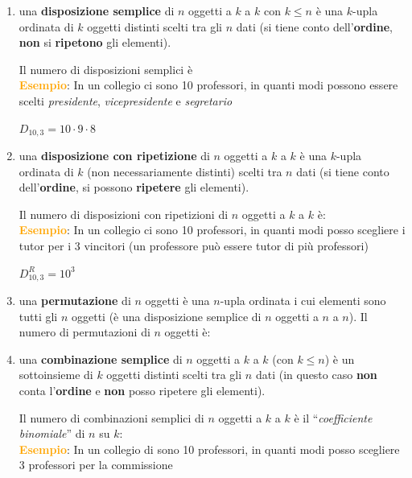 \begin{enumerate}[nosep]
    \item una \textbf{disposizione semplice} di $n$ oggetti a $k$ a $k$ con $k \leq n$ è una $k$-upla ordinata di $k$ oggetti distinti scelti tra gli $n$ dati (si tiene conto dell'\textbf{ordine}, \textbf{non} si \textbf{ripetono} gli elementi).
    \begin{boxA}
        Il numero di disposizioni semplici è  \\
        \textcolor{orange}{\textbf{Esempio}}: In un collegio ci sono 10 professori, in quanti modi possono essere scelti \textit{presidente}, \textit{vicepresidente} e \textit{segretario}
        
        {\centering
            $D_{10, 3} = 10 \cdot 9 \cdot 8$
        \par}
    \end{boxA}
    \item una \textbf{disposizione con ripetizione} di $n$ oggetti a $k$ a $k$ è una $k$-upla ordinata di $k$ (non necessariamente distinti) scelti tra $n$ dati (si tiene conto dell'\textbf{ordine}, si possono \textbf{ripetere} gli elementi).
    \begin{boxA}
        Il numero di disposizioni con ripetizioni di $n$ oggetti a $k$ a $k$ è:  \\
        \textcolor{orange}{\textbf{Esempio}}: In un collegio ci sono 10 professori, in quanti modi posso scegliere i tutor per i 3 vincitori (un professore può essere tutor di più professori)

        {\centering
            $D^R_{10,3} = 10^3$
        \par}
    \end{boxA}
    
    \newpage
    \item una \textbf{permutazione} di $n$ oggetti è una $n$-upla ordinata i cui elementi sono tutti gli $n$ oggetti (è una disposizione semplice di $n$ oggetti a $n$ a $n$). Il numero di permutazioni di $n$ oggetti è:
    
    {\centering
    \par}
    
    \item una \textbf{combinazione semplice} di $n$ oggetti a $k$ a $k$ (con $k \leq n$) è un sottoinsieme di $k$ oggetti distinti scelti tra gli $n$ dati (in questo caso \textbf{non} conta l'\textbf{ordine} e \textbf{non} posso ripetere gli elementi).
    \begin{boxA}
        Il numero di combinazioni semplici di $n$ oggetti a $k$ a $k$ è il ``\textit{coefficiente binomiale}'' di $n$ su $k$:  \\
        \textcolor{orange}{\textbf{Esempio}}: In un collegio di sono 10 professori, in quanti modi posso scegliere 3 professori per la commissione


\end{boxA}
\end{enumerate}
